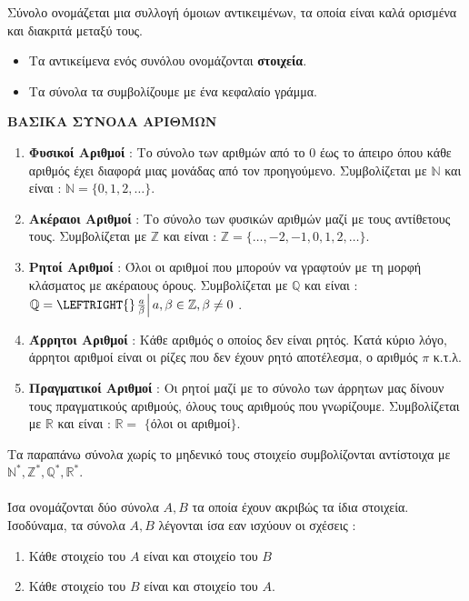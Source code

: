 \documentclass[twoside,nofonts,internet,shmeiwseis]{thewria}
\DeclareRobustCommand{\frac}[3][0pt]{%
{\begingroup\hspace{#1}#2\hspace{#1}\endgroup\over\hspace{#1}#3\hspace{#1}}}
\begin{document}
\orismoi
{} Σύνολο ονομάζεται μια συλλογή όμοιων αντικειμένων, τα οποία είναι καλά ορισμένα και διακριτά μεταξύ τους.
\begin{itemize}[itemsep=0mm]
\item Τα αντικείμενα ενός συνόλου ονομάζονται \textbf{στοιχεία}.
\item Τα σύνολα τα συμβολίζουμε με ένα κεφαλαίο γράμμα.
\end{itemize}
\textbf{ΒΑΣΙΚΑ ΣΥΝΟΛΑ ΑΡΙΘΜΩΝ}
\begin{enumerate}[itemsep=0mm,label=\bf\arabic*.]
\item \textbf{Φυσικοί Αριθμοί} : Το σύνολο των αριθμών από το 0 έως το άπειρο όπου κάθε αριθμός έχει διαφορά μιας μονάδας από τον προηγούμενο. Συμβολίζεται με $ \mathbb{N} $ και είναι : $ \mathbb{N}=\{0,1,2,\ldots\} $.
\item \textbf{Ακέραιοι Αριθμοί} : Το σύνολο των φυσικών αριθμών μαζί με τους αντίθετους τους. Συμβολίζεται με $ \mathbb{Z} $ και είναι : $ \mathbb{Z}=\{\ldots,-2,-1,0,1,2,\ldots\} $.
\item \textbf{Ρητοί Αριθμοί} : Όλοι οι αριθμοί που μπορούν να γραφτούν με τη μορφή κλάσματος με ακέραιους όρους. Συμβολίζεται με $ \mathbb{Q} $ και είναι : $ \mathbb{Q}=\LEFTRIGHT\{\}{\left. \frac{a}{\beta}\right|a,\beta\in\mathbb{Z},\beta\neq0\;} $.
\item \textbf{Άρρητοι Αριθμοί} : Κάθε αριθμός ο οποίος δεν είναι ρητός. Κατά κύριο λόγο, άρρητοι αριθμοί είναι οι ρίζες που δεν έχουν ρητό αποτέλεσμα, ο αριθμός $ \pi $ κ.τ.λ.
\item \textbf{Πραγματικοί Αριθμοί} : Οι ρητοί μαζί με το σύνολο των άρρητων μας δίνουν τους πραγματικούς αριθμούς, όλους τους αριθμούς που γνωρίζουμε. Συμβολίζεται με $ \mathbb{R} $ και είναι : $ \mathbb{R}= $ $ \{ $όλοι οι αριθμοί$ \} $.
\end{enumerate}
Τα παραπάνω σύνολα χωρίς το μηδενικό τους στοιχείο συμβολίζονται αντίστοιχα με $ \mathbb{N}^*,\mathbb{Z}^*,\mathbb{Q}^*,\mathbb{R}^*$.\\\\
 Ίσα ονομάζονται δύο σύνολα $ A,B $ τα οποία έχουν ακριβώς τα ίδια στοιχεία. Ισοδύναμα, τα σύνολα $ Α,Β $ λέγονται ίσα εαν ισχύουν οι σχέσεις :
\begin{enumerate}[itemsep=0mm]
\item Κάθε στοιχείο του $ A $ είναι και στοιχείο του $ B $
\item Κάθε στοιχείο του $ B $ είναι και στοιχείο του $ A $.
\end{enumerate}
\end{document}
